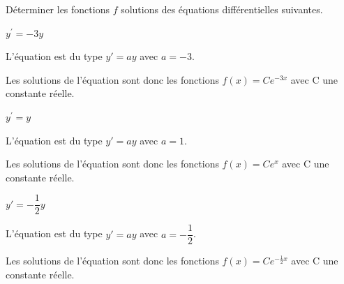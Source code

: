 \documentclass[11pt,a4paper]{article}  %
\begin{document}
\exerciceDS{}

Déterminer les fonctions $f$ solutions des équations différentielles suivantes.
	\begin{enumMet}
	\item $y^{\prime}=-3 y$
	\begin{corrBox}
		L'équation est du type $y'=ay$ avec $a=-3$. 
		
		Les solutions de l'équation sont donc les fonctions $f(x)=Ce^{-3x}$ avec C une constante réelle.		
	\end{corrBox}
	\item $y^{\prime}=y$
	\begin{corrBox}
		L'équation est du type $y'=ay$ avec $a=1$. 
		
		Les solutions de l'équation sont donc les fonctions $f(x)=Ce^{x}$ avec C une constante réelle.		
	\end{corrBox}
	\item $y'=-\dfrac{1}{2} y$
	\begin{corrBox}
		L'équation est du type $y'=ay$ avec $a=-\dfrac{1}{2}$. 
		
		Les solutions de l'équation sont donc les fonctions $f(x)=Ce^{-\frac{1}{2}x}$ avec C une constante réelle.		
	\end{corrBox}
\end{enumMet}

\end{document}
